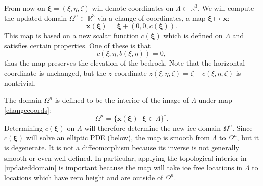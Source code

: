 \documentclass[letterpaper,final,12pt,reqno]{amsart}
\newcommand{\RR}{\mathbb{R}}
\newcommand{\bx}{\mathbf{x}}
\newcommand{\bxi}{\bm{\xi}}
\begin{document}
From now on $\bxi=(\xi,\eta,\zeta)$ will denote coordinates on $\Lambda \subset \RR^3$.  We will compute the updated domain $\Omega^n \subset \RR^3$ via a change of coordinates, a map $\bxi \mapsto \bx$:
\begin{equation}
\bx(\bxi) = \bxi + (0,0,c(\bxi)). \label{changecoords}
\end{equation}
This map is based on a new scalar function $c(\bxi)$ which is defined on $\Lambda$ and satisfies certain properties.  One of these is that
\begin{equation}
c(\xi,\eta,b(\xi,\eta))=0, \label{mapbasetobase}
\end{equation}
thus the map preserves the elevation of the bedrock.  Note that the horizontal coordinate is unchanged, but the $z$-coordinate $z(\xi,\eta,\zeta)=\zeta+c(\xi,\eta,\zeta)$ is nontrivial.

The domain $\Omega^n$ is defined to be the interior of the image of $\Lambda$ under map \eqref{changecoords}:
\begin{equation}
\Omega^n = \{\bx(\bxi) \,\big|\, \bxi \in \Lambda\}^\circ. \label{updateddomain}
\end{equation}
Determining $c(\bxi)$ on $\Lambda$ will therefore determine the new ice domain $\Omega^n$.  Since $c(\bxi)$ will solve an elliptic PDE (below), the map is smooth from $\Lambda$ to $\Omega^n$, but it is degenerate.  It is not a diffeomorphism because its inverse is not generally smooth or even well-defined.  In particular, applying the topological interior in \eqref{updateddomain} is important because the map will take ice free locations in $\Lambda$ to locations which have zero height and are outside of $\Omega^n$.
\end{document}
